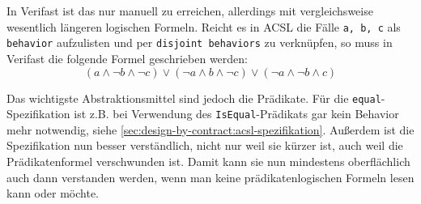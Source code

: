 In Verifast ist das nur manuell zu erreichen, allerdings mit vergleichsweise wesentlich längeren logischen Formeln.
Reicht es in ACSL die Fälle \lstinline{a, b, c} als \lstinline{behavior} aufzulisten und per \lstinline{disjoint behaviors}
zu verknüpfen, so muss in Verifast die folgende Formel geschrieben werden:
\[(a \land \neg b \land \neg c) \lor (\neg a \land b \land \neg c) \lor (\neg a \land \neg b \land c)\]

Das wichtigste Abstraktionsmittel sind jedoch die Prädikate. Für die \lstinline{equal}-Spezifikation ist 
z.B. bei Verwendung des \lstinline{IsEqual}-Prädikats gar kein Behavior mehr notwendig,
siehe \ref{sec:design-by-contract:acsl-spezifikation}. Außerdem ist die Spezifikation nun besser verständlich,
nicht nur weil sie kürzer ist, auch weil die Prädikatenformel verschwunden ist. Damit kann sie nun mindestens
oberflächlich auch dann verstanden werden, wenn man keine prädikatenlogischen Formeln lesen kann oder möchte.
